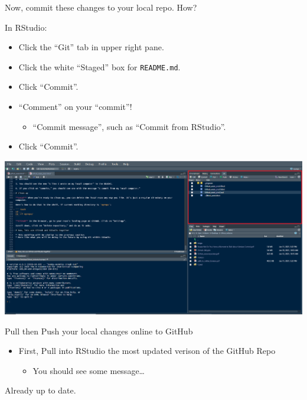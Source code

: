\documentclass[
  ignorenonframetext,
]{beamer}
\newenvironment{Shaded}{\begin{snugshade}}{\end{snugshade}}
\newcommand{\ExtensionTok}[1]{#1}
\newcommand{\NormalTok}[1]{#1}
\providecommand{\tightlist}{%
  \setlength{\itemsep}{0pt}\setlength{\parskip}{0pt}}
\begin{document}
\begin{frame}[fragile]{Now, commit these changes to your local repo.
How?}
\protect\hypertarget{now-commit-these-changes-to-your-local-repo.-how}{}

In RStudio:

\begin{itemize}
\tightlist
\item
  Click the ``Git'' tab in upper right pane.
\item
  Click the white ``Staged'' box for \texttt{README.md}.
\item
  Click ``Commit''.
\item
  ``Comment'' on your ``commit''!

  \begin{itemize}
  \tightlist
  \item
    ``Commit message'', such as ``Commit from RStudio''.
  \end{itemize}
\item
  Click ``Commit''.
\end{itemize}

\includegraphics{pres_figs/git_in_rstuido.png}

\begin{block}{Pull then Push your local changes online to GitHub}

\begin{itemize}
\tightlist
\item
  First, Pull into RStudio the most updated verison of the GitHub Repo

  \begin{itemize}
  \tightlist
  \item
    You should see some message\ldots{}
  \end{itemize}
\end{itemize}

\begin{Shaded}
\begin{Highlighting}[]
\ExtensionTok{Already}\NormalTok{ up to date.}
\end{Highlighting}
\end{Shaded}


\end{block}
\end{frame}
\end{document}
